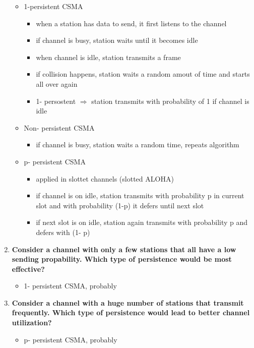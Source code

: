 \documentclass[a4paper,12pt]{article}
\begin{document}
\begin{enumerate}[label=(\roman*),itemsep=0pt]
		\begin{itemize}[itemsep=0pt]
			\item 1-persistent CSMA
			\begin{itemize}[itemsep=0pt]
				\item  when a station has data to send, it first listens to the channel
				\item  if channel is busy, station waits until it becomes idle
				\item  when channel is idle, station transmits a frame
				\item  if collision happens, station waits a random amout of time and starts all over again
				\item  1- persostent $\Rightarrow$ station transmits with probability of 1 if channel is idle		
			\end{itemize}
			\item Non- persistent CSMA
			\begin{itemize}[itemsep=0pt]
				\item  if channel is busy, station waits a random time, repeats algorithm
			\end{itemize}
			\item p- persistent CSMA
			\begin{itemize}[itemsep=0pt]
				\item  applied in slottet channels (slotted ALOHA)
				\item  if channel is on idle, station transmits with probability p in current slot and with probability (1-p) it defers until next slot
				\item  if next slot is on idle, station again transmits with probability p and defers with (1- p) 
			\end{itemize}		
		\end{itemize}
		\item \textbf{Consider a channel with only a few stations that all have a low sending propability. Which type of persistence would be most effective?}
		\begin{itemize}[itemsep=0pt]
			\item 1- persistent CSMA, probably
		\end{itemize}
		\item \textbf{Consider a channel with a huge number of stations that transmit frequently. Which type of persistence would lead to better channel utilization?}
		\begin{itemize}[itemsep=0pt]
			\item p- persistent CSMA, probably
		\end{itemize}
	\end{enumerate}
	
\end{document}
